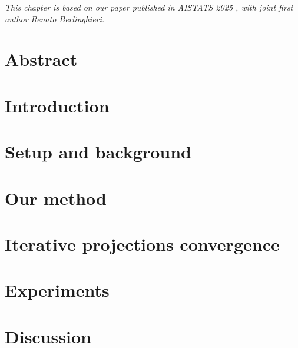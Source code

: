 

\textit{This chapter is based on our paper published in AISTATS 2025  \citep{shen2024multi}, with joint first author Renato Berlinghieri.} 

\section*{Abstract}


\section{Introduction}
\label{ch3sec:intro}


\section{Setup and background}
\label{ch3sec:setup}


\section{Our method}
\label{ch3sec:method}


\section{Iterative projections convergence}
\label{app:iter_proj_theory}



\section{Experiments}
\label{ch3sec:experiments-main}




\section{Discussion}
\label{ch3sec:discussion}



